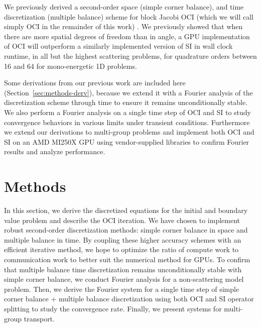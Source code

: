 We previously derived a second-order space (simple corner balance), and time discretization (multiple balance) scheme for block Jacobi OCI (which we will call simply OCI in the remainder of this work) \cite{morgan2023oci}.
We previously showed that when there are more spatial degrees of freedom than in angle, a GPU implementation of OCI will outperform a similarly implemented version of SI in wall clock runtime, in all but the highest scattering problems, for quadrature orders between \num{16} and \num{64} for mono-energetic 1D problems. 

Some derivations from our previous work are included here (Section~\ref{sec:methods-derv}), because we extend it with a Fourier analysis of the discretization scheme through time to ensure it remains unconditionally stable.
We also perform a Fourier analysis on a single time step of OCI and SI to study convergence behaviors in various limits under transient conditions.
Furthermore we extend our derivations to multi-group problems and implement both OCI and SI on an AMD MI250X GPU using vendor-supplied libraries to confirm Fourier results and analyze performance.

\section{Methods}

In this section, we derive the discretized equations for the initial and boundary value problem and describe the OCI iteration.
We have chosen to implement robust second-order discretization methods: simple corner balance  \cite{adams_subcell_1997} in space and multiple balance \cite{variansyah_robust_2021} in time.
By coupling these higher accuracy schemes with an efficient iterative method, we hope to optimize the ratio of compute work to communication work to better suit the numerical method for GPUs.
To confirm that multiple balance time discretization remains unconditionally stable with simple corner balance, we conduct Fourier analysis for a non-scattering model problem.
Then, we derive the Fourier system for a single time step of simple corner balance + multiple balance discretization using both OCI and SI operator splitting to study the convergence rate.
Finally, we present systems for multi-group transport.

